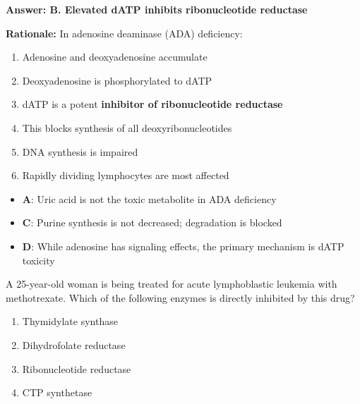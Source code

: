 \begin{solution}
\textbf{Answer: B. Elevated dATP inhibits ribonucleotide reductase}

\textbf{Rationale:} In adenosine deaminase (ADA) deficiency:
\begin{enumerate}
    \item Adenosine and deoxyadenosine accumulate
    \item Deoxyadenosine is phosphorylated to dATP
    \item dATP is a potent \textbf{inhibitor of ribonucleotide reductase}
    \item This blocks synthesis of all deoxyribonucleotides
    \item DNA synthesis is impaired
    \item Rapidly dividing lymphocytes are most affected
\end{enumerate}

\begin{itemize}
    \item \textbf{A}: Uric acid is not the toxic metabolite in ADA deficiency
    \item \textbf{C}: Purine synthesis is not decreased; degradation is blocked
    \item \textbf{D}: While adenosine has signaling effects, the primary mechanism is dATP toxicity
\end{itemize}
\end{solution}

\begin{exercise}
A 25-year-old woman is being treated for acute lymphoblastic leukemia with methotrexate. Which of the following enzymes is directly inhibited by this drug?
\begin{enumerate}[label=\Alph*.]
    \item Thymidylate synthase
    \item Dihydrofolate reductase
    \item Ribonucleotide reductase
    \item CTP synthetase
\end{enumerate}
\end{exercise}

